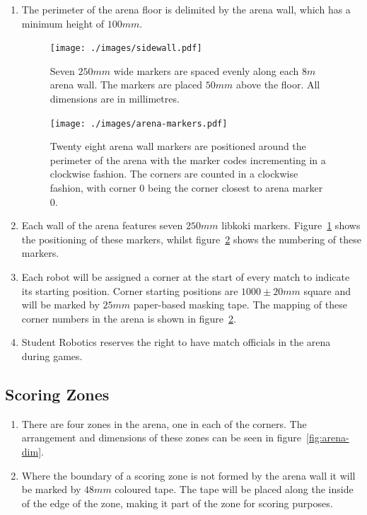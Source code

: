 \begin{enumerate}
\item The perimeter of the arena floor is delimited by the arena wall, which has a minimum height of $100mm$.

\begin{figure}
  \centering
  \texttt{[image: ./images/sidewall.pdf]}
  \caption{Seven $250mm$ wide markers are spaced evenly along each $8m$ arena wall.
           The markers are placed $50mm$ above the floor.
           All dimensions are in millimetres.}
  \label{fig:arena-wall}
\end{figure}

\begin{figure}
  \centering
  \texttt{[image: ./images/arena-markers.pdf]}
  \caption{Twenty eight arena wall markers are positioned around the perimeter of the arena with the marker codes incrementing in a clockwise fashion.
           The corners are counted in a clockwise fashion, with corner 0 being the corner closest to arena marker 0.}
  \label{fig:arena-zones}
\end{figure}

\item Each wall of the arena features seven $250mm$ libkoki markers.
      Figure~\ref{fig:arena-wall} shows the positioning of these markers, whilst figure~\ref{fig:arena-zones} shows the numbering of these markers.

\item Each robot will be assigned a corner at the start of every match to indicate its starting position.
      Corner starting positions are $1000 \pm 20mm$ square and will be marked by $25mm$ paper-based masking tape.
      The mapping of these corner numbers in the arena is shown in figure~\ref{fig:arena-zones}.

\item Student Robotics reserves the right to have match officials in the arena during games.

\end{enumerate}


\subsection{Scoring Zones}
\label{sub:Zones}

\begin{enumerate}
\item There are four zones in the arena, one in each of the corners.
      The arrangement and dimensions of these zones can be seen in figure~\ref{fig:arena-dim}.

\item Where the boundary of a scoring zone is not formed by the arena wall it will be marked by $48mm$ coloured tape.
      The tape will be placed along the inside of the edge of the zone, making it part of the zone for scoring purposes.
\end{enumerate}

